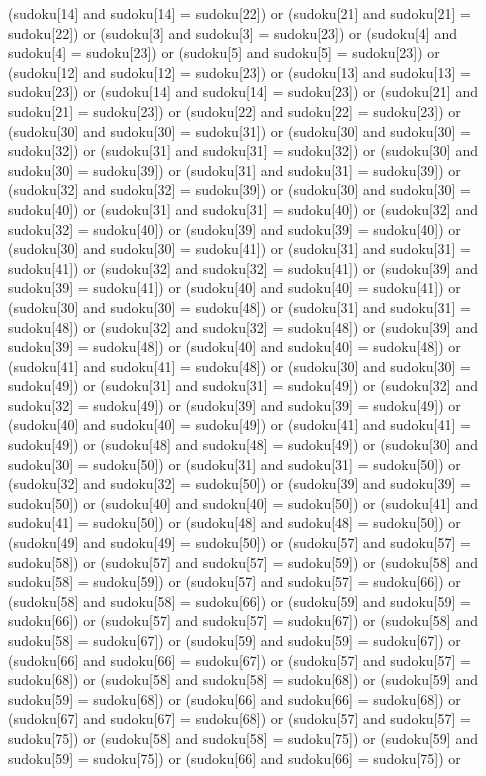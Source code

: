 \documentclass[8pt]{article}
\begin{document}
\begin{algorithm}[H]
(sudoku[14]  and sudoku[14] = sudoku[22]) or (sudoku[21]  and sudoku[21] = sudoku[22]) or (sudoku[3]  and sudoku[3] = sudoku[23]) or (sudoku[4]  and sudoku[4] = sudoku[23]) or (sudoku[5]  and sudoku[5] = sudoku[23]) or (sudoku[12]  and sudoku[12] = sudoku[23]) or (sudoku[13]  and sudoku[13] = sudoku[23]) or (sudoku[14]  and sudoku[14] = sudoku[23]) or (sudoku[21]  and sudoku[21] = sudoku[23]) or (sudoku[22]  and sudoku[22] = sudoku[23]) or (sudoku[30]  and sudoku[30] = sudoku[31]) or (sudoku[30]  and sudoku[30] = sudoku[32]) or (sudoku[31]  and sudoku[31] = sudoku[32]) or (sudoku[30]  and sudoku[30] = sudoku[39]) or (sudoku[31]  and sudoku[31] = sudoku[39]) or (sudoku[32]  and sudoku[32] = sudoku[39]) or (sudoku[30]  and sudoku[30] = sudoku[40]) or (sudoku[31]  and sudoku[31] = sudoku[40]) or (sudoku[32]  and sudoku[32] = sudoku[40]) or (sudoku[39]  and sudoku[39] = sudoku[40]) or (sudoku[30]  and sudoku[30] = sudoku[41]) or (sudoku[31]  and sudoku[31] = sudoku[41]) or (sudoku[32]  and sudoku[32] = sudoku[41]) or (sudoku[39]  and sudoku[39] = sudoku[41]) or (sudoku[40]  and sudoku[40] = sudoku[41]) or (sudoku[30]  and sudoku[30] = sudoku[48]) or (sudoku[31]  and sudoku[31] = sudoku[48]) or (sudoku[32]  and sudoku[32] = sudoku[48]) or (sudoku[39]  and sudoku[39] = sudoku[48]) or (sudoku[40]  and sudoku[40] = sudoku[48]) or (sudoku[41]  and sudoku[41] = sudoku[48]) or (sudoku[30]  and sudoku[30] = sudoku[49]) or (sudoku[31]  and sudoku[31] = sudoku[49]) or (sudoku[32]  and sudoku[32] = sudoku[49]) or (sudoku[39]  and sudoku[39] = sudoku[49]) or (sudoku[40]  and sudoku[40] = sudoku[49]) or (sudoku[41]  and sudoku[41] = sudoku[49]) or (sudoku[48]  and sudoku[48] = sudoku[49]) or (sudoku[30]  and sudoku[30] = sudoku[50]) or (sudoku[31]  and sudoku[31] = sudoku[50]) or (sudoku[32]  and sudoku[32] = sudoku[50]) or (sudoku[39]  and sudoku[39] = sudoku[50]) or (sudoku[40]  and sudoku[40] = sudoku[50]) or (sudoku[41]  and sudoku[41] = sudoku[50]) or (sudoku[48]  and sudoku[48] = sudoku[50]) or (sudoku[49]  and sudoku[49] = sudoku[50]) or (sudoku[57]  and sudoku[57] = sudoku[58]) or (sudoku[57]  and sudoku[57] = sudoku[59]) or (sudoku[58]  and sudoku[58] = sudoku[59]) or (sudoku[57]  and sudoku[57] = sudoku[66]) or (sudoku[58]  and sudoku[58] = sudoku[66]) or (sudoku[59]  and sudoku[59] = sudoku[66]) or (sudoku[57]  and sudoku[57] = sudoku[67]) or (sudoku[58]  and sudoku[58] = sudoku[67]) or (sudoku[59]  and sudoku[59] = sudoku[67]) or (sudoku[66]  and sudoku[66] = sudoku[67]) or (sudoku[57]  and sudoku[57] = sudoku[68]) or (sudoku[58]  and sudoku[58] = sudoku[68]) or (sudoku[59]  and sudoku[59] = sudoku[68]) or (sudoku[66]  and sudoku[66] = sudoku[68]) or (sudoku[67]  and sudoku[67] = sudoku[68]) or (sudoku[57]  and sudoku[57] = sudoku[75]) or (sudoku[58]  and sudoku[58] = sudoku[75]) or (sudoku[59]  and sudoku[59] = sudoku[75]) or (sudoku[66]  and sudoku[66] = sudoku[75]) or 
\end{algorithm}
\end{document}
